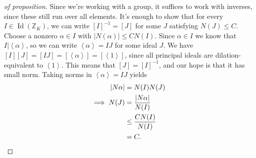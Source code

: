 \begin{proof}[of proposition]

Since we're working with a group, it suffices to work with inverses,
since these still run over all elements. It's enough to show that for
every \(I \in \operatorname{Id}({\mathbb{Z}}_K)\), we can write
\([I]^{-1}= [J]\) for some \(J\) satisfying \(N(J) \leq C\). Choose a
nonzero \(\alpha\in I\) with
\({\left\lvert {N( \alpha )} \right\rvert}\leq C N(I)\). Since
\(\alpha\in I\) we know that
\(I \mathrel{\Big|}\left\langle{ \alpha }\right\rangle\), so we can
write \(\left\langle{ \alpha }\right\rangle = IJ\) for some ideal \(J\).
We have
\([I] [J] = [IJ] = [ \left\langle{ \alpha }\right\rangle ] = [ \left\langle{ 1 }\right\rangle ]\),
since all principal ideals are dilation-equivalent to
\(\left\langle{ 1 }\right\rangle\). This means that \([J] = [I] ^{-1}\),
and our hope is that it has small norm. Taking norms in
\(\left\langle{ \alpha }\right\rangle = IJ\) yields
\begin{align*}
{\left\lvert {N \alpha} \right\rvert} 
&= N(I) N(J) \\
\implies N(J) 
&= { {\left\lvert {N \alpha} \right\rvert} \over N(I) } \\
&\leq { C N(I) \over N(I)} \\
&= C
.\end{align*}

\end{proof}

